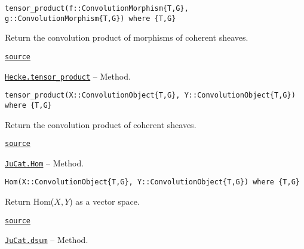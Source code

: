 \documentclass{memoir}
\begin{document}
\begin{adjustwidth}{2em}{0pt}


\begin{verbatim}
tensor_product(f::ConvolutionMorphism{T,G}, g::ConvolutionMorphism{T,G}) where {T,G}
\end{verbatim}

Return the convolution product of morphisms of coherent sheaves.



\href{https://github.com/FabianMaeurer/JuCat.jl/blob/367390e2d003deec2ababa73caeab405e934bb35/src/structures/ConvolutionCategory/ConvolutionCategory.jl#L163-L167}{\texttt{source}}


\end{adjustwidth}
\hypertarget{16297541892943593034}{} 
\hyperlink{16297541892943593034}{\texttt{Hecke.tensor\_product}}  -- {Method.}

\begin{adjustwidth}{2em}{0pt}


\begin{verbatim}
tensor_product(X::ConvolutionObject{T,G}, Y::ConvolutionObject{T,G}) where {T,G}
\end{verbatim}

Return the convolution product of coherent sheaves.



\href{https://github.com/FabianMaeurer/JuCat.jl/blob/367390e2d003deec2ababa73caeab405e934bb35/src/structures/ConvolutionCategory/ConvolutionCategory.jl#L151-L155}{\texttt{source}}


\end{adjustwidth}
\hypertarget{2205927259978641805}{} 
\hyperlink{2205927259978641805}{\texttt{JuCat.Hom}}  -- {Method.}

\begin{adjustwidth}{2em}{0pt}


\begin{verbatim}
Hom(X::ConvolutionObject{T,G}, Y::ConvolutionObject{T,G}) where {T,G}
\end{verbatim}

Return Hom(\(X,Y\)) as a vector space.



\href{https://github.com/FabianMaeurer/JuCat.jl/blob/367390e2d003deec2ababa73caeab405e934bb35/src/structures/ConvolutionCategory/ConvolutionCategory.jl#L239-L243}{\texttt{source}}


\end{adjustwidth}
\hypertarget{15703756832181133610}{} 
\hyperlink{15703756832181133610}{\texttt{JuCat.dsum}}  -- {Method.}
\end{document}
